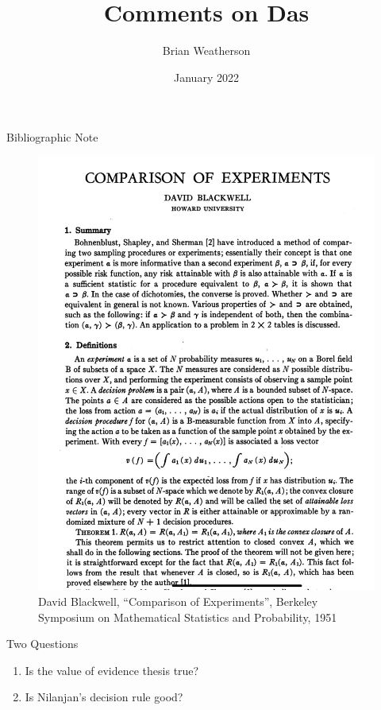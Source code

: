 \documentclass[
  ignorenonframetext,
]{beamer}
\title{Comments on Das}
\author{Brian Weatherson}
\date{January 2022}
\providecommand{\tightlist}{%
  \setlength{\itemsep}{0pt}\setlength{\parskip}{0pt}}
\begin{document}
\frame{\titlepage}

\begin{frame}[b]{Bibliographic Note}
\protect\hypertarget{bibliographic-note}{}
~

\begin{figure}
\centering
\includegraphics[width=\textwidth,height=0.7\textheight]{blackwell.png}
\caption{David Blackwell, ``Comparison of Experiments'', Berkeley
Symposium on Mathematical Statistics and Probability, 1951}
\end{figure}
\end{frame}

\begin{frame}{Two Questions}
\protect\hypertarget{two-questions}{}
\begin{enumerate}
\tightlist
\item
  Is the value of evidence thesis true?
\item
  Is Nilanjan's decision rule good?
\end{enumerate}
\end{frame}
\end{document}
